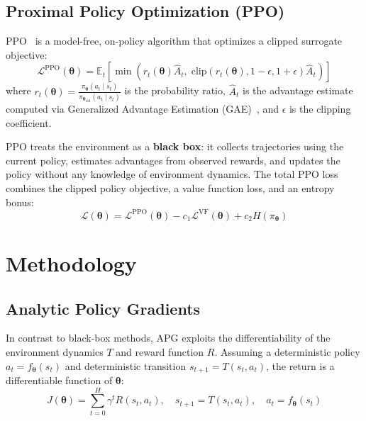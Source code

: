 \documentclass[11pt,a4paper]{article}
\newcommand{\E}{\mathbb{E}}
\newcommand{\cL}{\mathcal{L}}
\newcommand{\btheta}{\bm{\theta}}
\begin{document}
\subsection{Proximal Policy Optimization (PPO)}
\label{sec:ppo}

PPO~\cite{schulman2017ppo} is a model-free, on-policy algorithm that optimizes a clipped surrogate objective:
\begin{equation}
  \cL^{\text{PPO}}(\btheta) = \E_t\left[\min\left(r_t(\btheta) \hat{A}_t, \; \text{clip}\left(r_t(\btheta), 1-\epsilon, 1+\epsilon\right) \hat{A}_t\right)\right]
  \label{eq:ppo_loss}
\end{equation}
where $r_t(\btheta) = \frac{\pi_{\btheta}(a_t \mid s_t)}{\pi_{\btheta_{\text{old}}}(a_t \mid s_t)}$ is the probability ratio, $\hat{A}_t$ is the advantage estimate computed via Generalized Advantage Estimation (GAE)~\cite{schulman2016gae}, and $\epsilon$ is the clipping coefficient.

PPO treats the environment as a \textbf{black box}: it collects trajectories using the current policy, estimates advantages from observed rewards, and updates the policy without any knowledge of environment dynamics. The total PPO loss combines the clipped policy objective, a value function loss, and an entropy bonus:
\begin{equation}
  \cL(\btheta) = \cL^{\text{PPO}}(\btheta) - c_1 \cL^{\text{VF}}(\btheta) + c_2 H(\pi_{\btheta})
  \label{eq:ppo_total}
\end{equation}

\section{Methodology}
\label{sec:methodology}

\subsection{Analytic Policy Gradients}
\label{sec:apg_concept}

In contrast to black-box methods, APG exploits the differentiability of the environment dynamics $T$ and reward function $R$. Assuming a deterministic policy $a_t = f_{\btheta}(s_t)$ and deterministic transition $s_{t+1} = T(s_t, a_t)$, the return is a differentiable function of $\btheta$:
\begin{equation}
  J(\btheta) = \sum_{t=0}^{H} \gamma^t R(s_t, a_t), \quad s_{t+1} = T(s_t, a_t), \quad a_t = f_{\btheta}(s_t)
  \label{eq:apg_return}
\end{equation}
\end{document}
